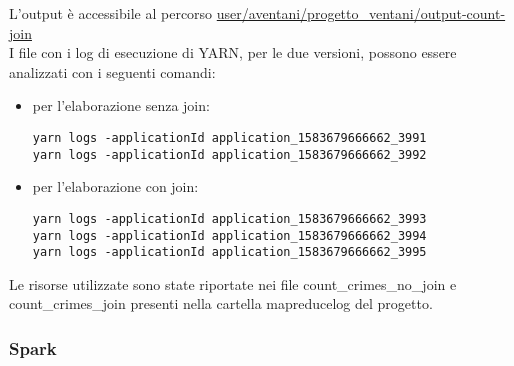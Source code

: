 \documentclass[10pt]{article}
\begin{document}
L'output è accessibile al percorso \url{user/aventani/progetto_ventani/output-count-join} \\

I file con i log di esecuzione di YARN, per le due versioni, possono essere analizzati con i seguenti comandi:
\begin{itemize}
\item per l'elaborazione senza join: 
\begin{lstlisting}
yarn logs -applicationId application_1583679666662_3991
yarn logs -applicationId application_1583679666662_3992
\end{lstlisting}
\item per l'elaborazione con join:
\begin{lstlisting}
yarn logs -applicationId application_1583679666662_3993
yarn logs -applicationId application_1583679666662_3994
yarn logs -applicationId application_1583679666662_3995
\end{lstlisting}
\end{itemize}
Le risorse utilizzate sono state riportate nei file count\_crimes\_no\_join e count\_crimes\_join presenti nella cartella \/mapreduce\/log del progetto.

\subsubsection{Spark}
\end{document}

